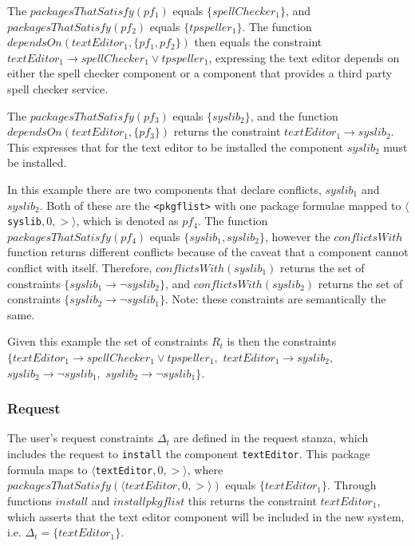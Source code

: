 The $packagesThatSatisfy(pf_1)$ equals $\{spellChecker_1\}$, and $packagesThatSatisfy(pf_2)$ equals $\{tpspeller_1\}$.
The function $dependsOn(textEditor_1 , \{pf_1,pf_2\} )$ 
then equals the constraint $textEditor_1 \rightarrow spellChecker_1 \vee tpspeller_1$,
expressing the text editor depends on either the spell checker component or a component that provides a third party spell checker service.

The $packagesThatSatisfy(pf_3)$ equals $\{syslib_2\}$,
and the function  $dependsOn(textEditor_1 , \{pf_3\} )$ returns the constraint  $textEditor_1 \rightarrow syslib_2$.
This expresses that for the text editor to be installed the component $syslib_2$ must be installed.

In this example there are two components that declare conflicts, $syslib_1$ and $syslib_2$.
Both of these are the \verb+<pkgflist>+ with one package formulae mapped to  $\langle $\verb+syslib+$,0,>\rangle$, which is denoted as $pf_4$.
The function $packagesThatSatisfy(pf_4)$ equals $\{ syslib_1,syslib_2 \}$,
however the $conflictsWith$ function returns different conflicts because of the caveat that a component cannot conflict with itself.
Therefore, $conflictsWith(syslib_1)$ returns the set of constraints $\{syslib_1 \rightarrow \neg syslib_2\}$,
and $conflictsWith(syslib_2)$ returns the set of constraints $\{syslib_2 \rightarrow \neg syslib_1\}$.
Note: these constraints are semantically the same.

Given this example the set of constraints $R_t$ is then the constraints
$\{ textEditor_1 \rightarrow spellChecker_1 \vee tpspeller_1,$ 
$textEditor_1 \rightarrow syslib_2,$ 
$syslib_2 \rightarrow \neg syslib_1,$   
$syslib_2 \rightarrow \neg syslib_1\}$.

\subsubsection{Request}
The user's request constraints $\Delta_t$ are defined in the request stanza, which includes the request to \verb+install+ the component \verb+textEditor+. 
This package formula maps to $\langle $\verb+textEditor+$,0,>\rangle$, where $packagesThatSatisfy(\langle textEditor,0,>\rangle)$ equals $\{textEditor_1\}$.
Through functions $install$ and $installpkgflist$ this returns the constraint $textEditor_1$,
which asserts that the text editor component will be included in the new system, i.e. $\Delta_t = \{textEditor_1\}$.

